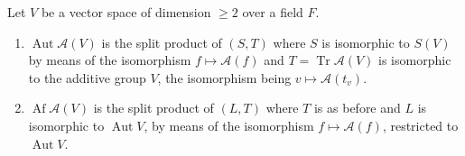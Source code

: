 Let $V$ be a vector space of dimension $\geq 2$ over a field $F$.

\begin{enumerate}
\item[(i)] $\operatorname{Aut} \mathcal{A}(V)$ is the split product of $(S, T)$ where $S$ is isomorphic to $S(V)$ by means of the isomorphism $f \mapsto \mathcal{A}(f)$ and $T = \operatorname{Tr} \mathcal{A}(V)$ is isomorphic to the additive group $V$, the isomorphism being $v \mapsto \mathcal{A}(t_v)$.

\item[(ii)] $\operatorname{Af} \mathcal{A}(V)$ is the split product of $(L, T)$ where $T$ is as before and $L$ is isomorphic to $\operatorname{Aut} V$, by means of the isomorphism $f \mapsto \mathcal{A}(f)$, restricted to $\operatorname{Aut} V$.
\end{enumerate}
